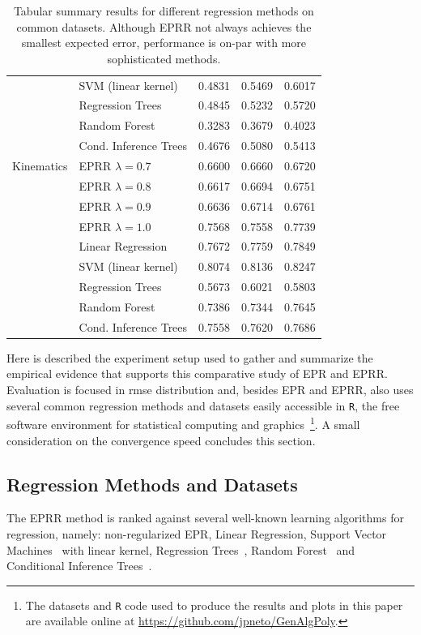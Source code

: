 \documentclass[review,preprint]{elsarticle}
\begin{document}
\begin{table}[t]
\begin{tabular}{ll|ccc}
					 & SVM (linear kernel) 	& 0.4831 & 0.5469 & 0.6017 \\
					 & Regression Trees 	& 0.4845 & 0.5232 & 0.5720 \\
					 & Random Forest 	& 0.3283 & 0.3679 & 0.4023 \\
					 & Cond. Inference Trees 	& 0.4676 & 0.5080 & 0.5413 \\
		Kinematics	 & EPRR $\lambda = 0.7$ 	& 0.6600 & 0.6660 & 0.6720 \\
					 & EPRR $\lambda = 0.8$ 	& 0.6617 & 0.6694 & 0.6751 \\
					 & EPRR $\lambda = 0.9$ 	& 0.6636 & 0.6714 & 0.6761 \\
					 & EPRR $\lambda = 1.0$ 	& 0.7568 & 0.7558 & 0.7739 \\
					 & Linear Regression 	& 0.7672 & 0.7759 & 0.7849 \\
					 & SVM (linear kernel) 	& 0.8074 & 0.8136 & 0.8247 \\
					 & Regression Trees 	& 0.5673 & 0.6021 & 0.5803 \\
					 & Random Forest 	& 0.7386 & 0.7344 & 0.7645 \\
					 & Cond. Inference Trees 	& 0.7558 & 0.7620 & 0.7686
	\end{tabular}
	\caption{Tabular summary results for different regression methods on common datasets. Although \ac{EPRR} not always achieves the smallest expected error, performance is on-par with more sophisticated methods.}
\end{table}
Here is described the experiment setup used to gather and summarize the empirical evidence that supports this comparative study of \ac{EPR} and \ac{EPRR}. Evaluation is focused in \ac{rmse} distribution and, besides \ac{EPR} and \ac{EPRR}, also uses several common regression methods and datasets easily accessible in \texttt{R}, the free software environment for statistical computing and graphics~\citep{R-Core-Team:2013aa}\footnote{The datasets and \texttt{R} code used to produce the results and plots in this paper are available online at \url{https://github.com/jpneto/GenAlgPoly}.}. A small consideration on the convergence speed concludes this section.

\subsection{Regression Methods and Datasets}

The \ac{EPRR} method is ranked against several well-known learning algorithms for regression, namely: non-regularized \ac{EPR}, Linear Regression, Support Vector Machines~\citep{Meyer:2012aa} with linear kernel, Regression Trees~\citep{Therneau:2013aa}, Random Forest~\citep{Strobl:2008aa,Strobl:2007aa} and Conditional Inference Trees~\citep{Hothorn:2006aa}.
%
%
\end{document}
